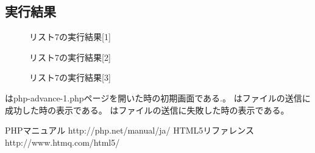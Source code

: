 \documentclass[a4j,10pt]{jsarticle}
\begin{document}
\subsection{実行結果}

\begin{figure}[H]
  \centering
  \caption{リスト7の実行結果[1]}
\label{fig:ad3}
\end{figure}

\begin{figure}[H]
  \centering
  \caption{リスト7の実行結果[2]}
\label{fig:ad4}
\end{figure}
\begin{figure}[H]
  \centering
  \caption{リスト7の実行結果[3]}
\label{fig:ad5}
\end{figure}

はphp-advance-1.phpページを開いた時の初期画面である.。
はファイルの送信に成功した時の表示である。
はファイルの送信に失敗した時の表示である。

\begin{thebibliography}{4}
   PHPマニュアル http://php.net/manual/ja/
   HTML5リファレンス http://www.htmq.com/html5/
\end{thebibliography}
\end{document}
